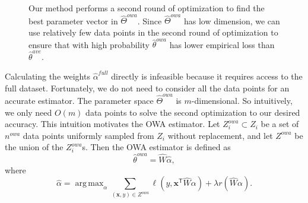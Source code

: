 \documentclass[twoside]{article}
\DeclareMathOperator*{\argmax}{arg\,max}
\newcommand{\Zowa}{Z^{\textit{owa}}}
\newcommand{\nowa}{n^{\textit{owa}}}
\newcommand{\matW}{\hat W}
\newcommand{\W}{{\hat \Theta^{\textit{owa}}}}
\newcommand{\E}{\mathbb{E}}
\newcommand{\x}{\mathbf{x}}
\newcommand{\w}{\theta}
\newcommand{\ahat}{\hat\alpha}
\newcommand{\afull}{\ahat^{\textit{full}}}
\newcommand{\wowa}{\hat\w^{owa}}
\newcommand{\wowafull}{\hat\w^{\textit{owa,full}}}
\newcommand{\wave}{\hat\w^{ave}}
\newcommand{\wmle}{\hat\w^{erm}}
\newcommand{\reg}{r}
\newcommand{\loss}{\ell}
\newcommand{\trans}[1]{\ensuremath{{#1}^{\mathsf{T}}}}
\begin{document}
\begin{figure}
\hspace{-0.1in}
\vspace{-0.35in}
\caption{
    Our method performs a second round of optimization to find the best parameter vector in $\W$.
    Since $\W$ has low dimension, we can use relatively few data points in the second round of optimization to ensure that with high probability $\wowa$ has lower empirical loss than $\wave$.
}
\label{fig:contour}
\end{figure}

Calculating the weights $\afull$ directly is infeasible because it requires access to the full dataset.
Fortunately, we do not need to consider all the data points for an accurate estimator.
The parameter space $\W$ is $m$-dimensional.
So intuitively, we only need $O(m)$ data points to solve the second optimization to our desired accuracy.
This intuition motivates the OWA estimator.
Let $\Zowa_i\subset Z_i$ be a set of $\nowa$ data points uniformly sampled from $Z_i$ without replacement,
and let $\Zowa$ be the union of the $\Zowa_i$s.
Then the OWA estimator is defined as
\begin{equation}
\wowa = \matW \ahat,
\end{equation}
where
\begin{equation}
\label{eq:ahat}
\ahat = \argmax_\alpha \sum _{(\x,y)\in \Zowa} \loss\left(y,\trans\x \matW \alpha \right)
+ \lambda \reg(\matW\alpha)
.
\end{equation}
\end{document}
